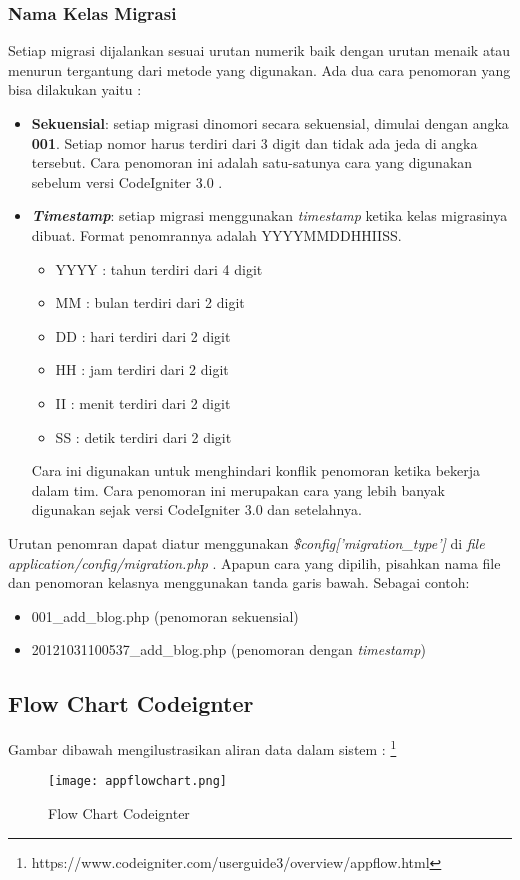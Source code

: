 \subsubsection{Nama Kelas Migrasi}
Setiap migrasi dijalankan sesuai urutan numerik baik dengan urutan menaik atau menurun tergantung dari metode yang digunakan. Ada dua cara penomoran yang bisa dilakukan yaitu :
\begin{itemize}
	\item \textbf{Sekuensial}: setiap migrasi dinomori secara sekuensial, dimulai dengan angka \textbf{001}. Setiap nomor harus terdiri dari 3 digit dan tidak ada jeda di angka tersebut. Cara penomoran ini adalah satu-satunya cara yang digunakan sebelum versi CodeIgniter 3.0 .
	\item \textbf{\textit{Timestamp}}: setiap migrasi menggunakan \textit{timestamp} ketika kelas migrasinya dibuat. Format penomrannya adalah YYYYMMDDHHIISS.
		\begin{itemize}
		\item YYYY	: tahun terdiri dari 4 digit
		\item MM	: bulan terdiri dari 2 digit
		\item DD	: hari terdiri dari 2 digit
		\item HH	: jam terdiri dari 2 digit
		\item II	: menit terdiri dari 2 digit
		\item SS	: detik terdiri dari 2 digit
		\end{itemize}
Cara ini digunakan untuk menghindari konflik penomoran ketika bekerja dalam tim. Cara penomoran ini merupakan cara yang lebih banyak digunakan sejak versi CodeIgniter 3.0 dan setelahnya.
\end{itemize}
Urutan penomran dapat diatur menggunakan \textit{\$config['migration\_type']} di \textit{file} \textit{application/config/migration.php} . Apapun cara yang dipilih, pisahkan nama file dan penomoran kelasnya menggunakan tanda garis bawah. Sebagai contoh:
\begin{itemize}
	\item 001\_add\_blog.php (penomoran sekuensial)
	\item 20121031100537\_add\_blog.php (penomoran dengan \textit{timestamp})
\end{itemize}

\subsection{Flow Chart Codeignter}
Gambar dibawah mengilustrasikan aliran data dalam sistem : \footnote{https://www.codeigniter.com/userguide3/overview/appflow.html}
\begin{figure} [H]
	\centering  
	\texttt{[image: appflowchart.png]}  
	\caption[Flow Chart Codeignter]{Flow Chart Codeignter} 
	\label{fig:flow-chart-CodeIgniter} 
\end{figure}

